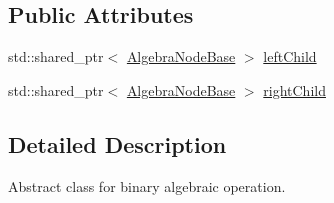 \subsection*{Public Attributes}
\begin{DoxyCompactItemize}
\item 
std\+::shared\+\_\+ptr$<$ \hyperlink{classrafe_1_1_algebra_node_base}{Algebra\+Node\+Base} $>$ \hyperlink{classrafe_1_1_binary_algebra_node_base_af7380a182bdb21a519f3dd31ae189782}{left\+Child}
\item 
std\+::shared\+\_\+ptr$<$ \hyperlink{classrafe_1_1_algebra_node_base}{Algebra\+Node\+Base} $>$ \hyperlink{classrafe_1_1_binary_algebra_node_base_a147cbdd038dcd2f2fc5240e4594b3597}{right\+Child}
\end{DoxyCompactItemize}


\subsection{Detailed Description}
Abstract class for binary algebraic operation. 

